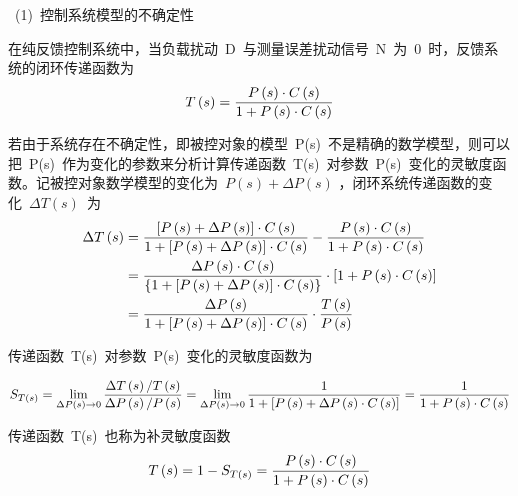 ~(1)~控制系统模型的不确定性

在纯反馈控制系统中，当负载扰动~D~与测量误差扰动信号~N~为~0~时，反馈系统的闭环传递函数为
\begin{equation}\label{equ:chap3:Index6}
  T\left(s\right)=\displaystyle\frac{P\left(s\right)\cdot C\left(s\right)}{1+P\left(s\right)\cdot C\left(s\right)}
\end{equation}

若由于系统存在不确定性，即被控对象的模型~P(s)~不是精确的数学模型，则可以把~P(s)~作为变化的参数来分析计算传递函数~T(s)~对参数~P(s)~变化的灵敏度函数。记被控对象数学模型的变化为~$P\left(s\right)+\Delta P\left(s\right)$  ，闭环系统传递函数的变化~$\Delta T\left(s\right)$~为
\begin{equation}\label{equ:chap3:Index7}
 \begin{aligned}
  \Delta T\left(s\right)&=\displaystyle\frac{\left[P\left(s\right)+\Delta P\left(s\right)\right]\cdot C\left(s\right)}{1+\left[P\left(s\right)+\Delta P\left(s\right)\right]\cdot C\left(s\right)}-\displaystyle\frac{P\left(s\right)\cdot C\left(s\right)}{1+P\left(s\right)\cdot C\left(s\right)}\\
  &=\displaystyle\frac{\Delta P\left(s\right)\cdot C\left(s\right)}{\left\{1+\left[P\left(s\right)+\Delta P\left(s\right)\right]\cdot C\left(s\right)\right\}}\cdot \left[1+P\left(s\right)\cdot C\left(s\right)\right]\\
  &=\displaystyle\frac{\Delta P\left(s\right)}{1+\left[P\left(s\right)+\Delta P\left(s\right)\right]\cdot C\left(s\right)}\cdot \displaystyle\frac{T\left(s\right)}{P\left(s\right)}
  \end{aligned}
\end{equation}

传递函数~T(s)~对参数~P(s)~变化的灵敏度函数为
\begin{small}
\begin{equation}\label{equ:chap3:Index8}
     S_{T\left(s\right)}=\lim_{\Delta P\left(s\right) \to 0}\displaystyle\frac{\Delta T\left(s\right)/T\left(s\right)}{\Delta P\left(s\right)/P\left(s\right)}=\lim_{\Delta P\left(s\right) \to 0}\displaystyle\frac{1}{1+\left[P\left(s\right)+\Delta P\left(s\right)\cdot C\left(s\right)\right]}=\displaystyle\frac{1}{1+P\left(s\right)\cdot C\left(s\right)}
\end{equation}
\end{small}

传递函数~T(s)~也称为补灵敏度函数
\begin{equation}\label{equ:chap3:Index9}
  T\left(s\right)=1-S_{T\left(s\right)}=\displaystyle\frac{P\left(s\right)\cdot C\left(s\right)}{1+P\left(s\right)\cdot C\left(s\right)}
\end{equation}

